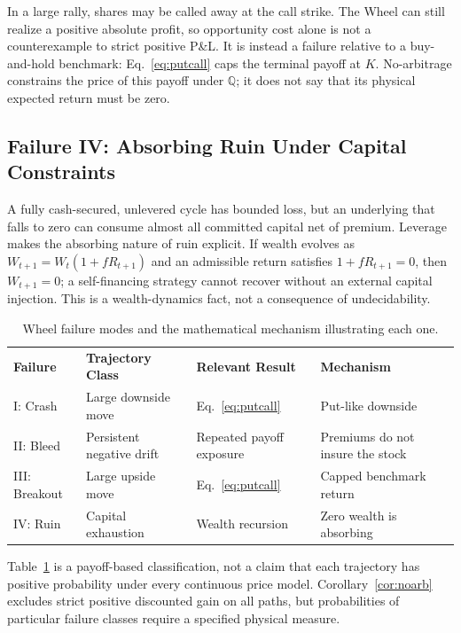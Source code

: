 \documentclass[aps,pra,reprint,superscriptaddress,amsmath,amssymb]{revtex4-2}
\theoremstyle{plain}
\theoremstyle{definition}
\theoremstyle{remark}
\begin{document}
In a large rally, shares may be called away at the call strike. The Wheel can
still realize a positive absolute profit, so opportunity cost alone is not a
counterexample to strict positive P\&L. It is instead a failure relative to a
buy-and-hold benchmark: Eq.~\eqref{eq:putcall} caps the terminal payoff at
\(K\). No-arbitrage constrains the price of this payoff under
\(\mathbb{Q}\); it does not say that its physical expected return must be zero.

\subsection{Failure IV: Absorbing Ruin Under Capital Constraints}

A fully cash-secured, unlevered cycle has bounded loss, but an underlying that
falls to zero can consume almost all committed capital net of premium.
Leverage makes the absorbing nature of ruin explicit. If wealth evolves as
\(W_{t+1}=W_t(1+fR_{t+1})\) and an admissible return satisfies
\(1+fR_{t+1}=0\), then \(W_{t+1}=0\); a self-financing strategy cannot recover
without an external capital injection. This is a wealth-dynamics fact, not a
consequence of undecidability.

\begin{table}[ht]
\caption{\label{tab:failuremodes}Wheel failure modes and the mathematical mechanism illustrating each one.}
\begin{ruledtabular}
\begin{tabular*}{\textwidth}{@{\extracolsep{\fill}}llll}
\textbf{Failure} & \textbf{Trajectory Class} & \textbf{Relevant Result} & \textbf{Mechanism} \\
\colrule
I: Crash & Large downside move & Eq.~\eqref{eq:putcall} & Put-like downside \\
II: Bleed & Persistent negative drift & Repeated payoff exposure & Premiums do not insure the stock \\
III: Breakout & Large upside move & Eq.~\eqref{eq:putcall} & Capped benchmark return \\
IV: Ruin & Capital exhaustion & Wealth recursion & Zero wealth is absorbing \\
\end{tabular*}
\end{ruledtabular}
\end{table}

Table~\ref{tab:failuremodes} is a payoff-based classification, not a claim
that each trajectory has positive probability under every continuous price
model. Corollary~\ref{cor:noarb} excludes strict positive discounted gain on
all paths, but probabilities of particular failure classes require a specified
physical measure.
\end{document}
